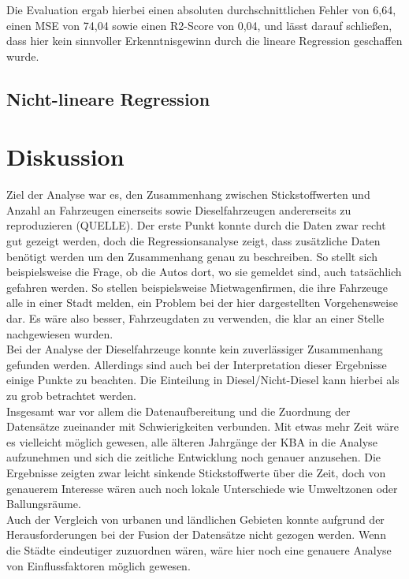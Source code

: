 \documentclass[11pt,a4paper,oneside,german]{article}
\begin{document}
	Die Evaluation ergab hierbei einen absoluten durchschnittlichen Fehler von 6,64, einen MSE von 74,04 sowie einen R2-Score von 0,04, und lässt darauf schließen, dass hier kein sinnvoller Erkenntnisgewinn durch die lineare Regression geschaffen wurde.
	
	\subsection{Nicht-lineare Regression}
	
	\section{Diskussion}
	
	Ziel der Analyse war es, den Zusammenhang zwischen Stickstoffwerten und Anzahl an Fahrzeugen einerseits sowie Dieselfahrzeugen andererseits zu reproduzieren (QUELLE). Der erste Punkt konnte durch die Daten zwar recht gut gezeigt werden, doch die Regressionsanalyse zeigt, dass zusätzliche Daten benötigt werden um den Zusammenhang genau zu beschreiben. So stellt sich beispielsweise die Frage, ob die Autos dort, wo sie gemeldet sind, auch tatsächlich gefahren werden. So stellen beispielsweise Mietwagenfirmen, die ihre Fahrzeuge alle in einer Stadt melden, ein Problem bei der hier dargestellten Vorgehensweise dar. Es wäre also besser, Fahrzeugdaten zu verwenden, die klar an einer Stelle nachgewiesen wurden. \\
	Bei der Analyse der Dieselfahrzeuge konnte kein zuverlässiger Zusammenhang gefunden werden. Allerdings sind auch bei der Interpretation dieser Ergebnisse einige Punkte zu beachten. Die Einteilung in Diesel/Nicht-Diesel kann hierbei als zu grob betrachtet werden. \\
	Insgesamt war vor allem die Datenaufbereitung und die Zuordnung der Datensätze zueinander mit Schwierigkeiten verbunden. Mit etwas mehr Zeit wäre es vielleicht möglich gewesen, alle älteren Jahrgänge der KBA in die Analyse aufzunehmen und sich die zeitliche Entwicklung noch genauer anzusehen. Die Ergebnisse zeigten zwar leicht sinkende Stickstoffwerte über die Zeit, doch von genauerem Interesse wären auch noch lokale Unterschiede wie Umweltzonen oder Ballungsräume. \\
	Auch der Vergleich von urbanen und ländlichen Gebieten konnte aufgrund der Herausforderungen bei der Fusion der Datensätze nicht gezogen werden. Wenn die Städte eindeutiger zuzuordnen wären, wäre hier noch eine genauere Analyse von Einflussfaktoren möglich gewesen. \\
	
\end{document}
